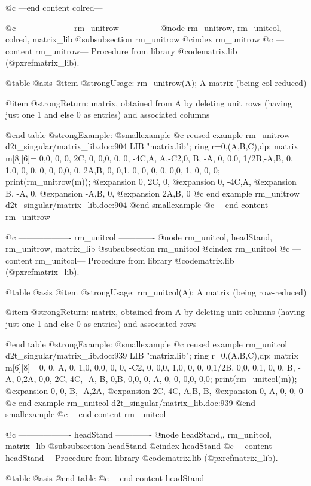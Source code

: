 @c ---end content colred---

@c ------------------- rm_unitrow -------------
@node rm_unitrow, rm_unitcol, colred, matrix_lib
@subsubsection rm_unitrow
@cindex rm_unitrow
@c ---content rm_unitrow---
Procedure from library @code{matrix.lib} (@pxref{matrix_lib}).

@table @asis
@item @strong{Usage:}
rm_unitrow(A); A matrix (being col-reduced)

@item @strong{Return:}
matrix, obtained from A by deleting unit rows (having just one 1
and else 0 as entries) and associated columns

@end table
@strong{Example:}
@smallexample
@c reused example rm_unitrow d2t_singular/matrix_lib.doc:904 
LIB "matrix.lib";
ring r=0,(A,B,C),dp;
matrix m[8][6]=
0,0,  0,   0, 2C, 0,
0,0,  0,   0, -4C,A,
A,-C2,0,   B, -A, 0,
0,0,  1/2B,-A,B,  0,
1,0,  0,   0, 0,  0,
0,0,  0,   2A,B,  0,
0,1,  0,   0, 0,  0,
0,0,  1,   0, 0,  0;
print(rm_unitrow(m));
@expansion{} 0, 2C, 0,
@expansion{} 0, -4C,A,
@expansion{} B, -A, 0,
@expansion{} -A,B,  0,
@expansion{} 2A,B,  0 
@c end example rm_unitrow d2t_singular/matrix_lib.doc:904
@end smallexample
@c ---end content rm_unitrow---

@c ------------------- rm_unitcol -------------
@node rm_unitcol, headStand, rm_unitrow, matrix_lib
@subsubsection rm_unitcol
@cindex rm_unitcol
@c ---content rm_unitcol---
Procedure from library @code{matrix.lib} (@pxref{matrix_lib}).

@table @asis
@item @strong{Usage:}
rm_unitcol(A); A matrix (being row-reduced)

@item @strong{Return:}
matrix, obtained from A by deleting unit columns (having just one 1
and else 0 as entries) and associated rows

@end table
@strong{Example:}
@smallexample
@c reused example rm_unitcol d2t_singular/matrix_lib.doc:939 
LIB "matrix.lib";
ring r=0,(A,B,C),dp;
matrix m[6][8]=
0,  0,    A,   0, 1,0,  0,0,
0,  0,  -C2,   0, 0,0,  1,0,
0,  0,    0,1/2B, 0,0,  0,1,
0,  0,    B,  -A, 0,2A, 0,0,
2C,-4C,  -A,   B, 0,B,  0,0,
0,  A,    0,   0, 0,0,  0,0;
print(rm_unitcol(m));
@expansion{} 0, 0,  B, -A,2A,
@expansion{} 2C,-4C,-A,B, B, 
@expansion{} 0, A,  0, 0, 0  
@c end example rm_unitcol d2t_singular/matrix_lib.doc:939
@end smallexample
@c ---end content rm_unitcol---

@c ------------------- headStand -------------
@node headStand,, rm_unitcol, matrix_lib
@subsubsection headStand
@cindex headStand
@c ---content headStand---
Procedure from library @code{matrix.lib} (@pxref{matrix_lib}).

@table @asis
@end table
@c ---end content headStand---

